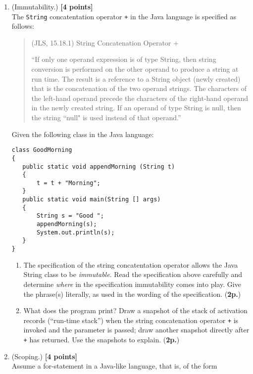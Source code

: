 \documentclass{article}
\begin{document}
\begin{enumerate}
\item (Immutability.) \hfill{\textbf{[4 points]}}
\\
The \texttt{String} concatentation operator \texttt{+} in the Java
language is specified as follows:


\begin{quote}
(JLS, 15.18.1) String Concatenation Operator +

``If only one operand expression is of type String, then string conversion is performed on the other operand to produce a string at run time. The result is a reference to a String object (newly created) that is the concatenation of the two operand strings. The characters of the left-hand operand precede the characters of the right-hand operand in the newly created string. If an operand of type String is null, then the string ``null" is used instead of that operand.''
\end{quote}

 Given the following class 
in the Java language: 
{\small 
\begin{verbatim}
class GoodMorning 
{
   public static void appendMorning (String t)
   {
       t = t + "Morning";
   }
   public static void main(String [] args)
   {
       String s = "Good ";
       appendMorning(s);
       System.out.println(s);
   }
}
\end{verbatim}
}
\begin{enumerate}
\item
The specification of the string concatentation operator allows 
the Java String class to be \textit{immutable}. Read the
specification above carefully and determine \textit{where} in the specification
immutability comes into play. Give the  phrase(s) literally, as used in 
the wording of the specification. (\textbf{2p.})
\item 
What does the program print? 
Draw a snapshot of the stack of activation records (``run-time stack'')
when the string concatenation operator \texttt{+} is invoked and the parameter is passed;
draw another snapshot directly after \texttt{+} has returned. 
Use the snapshots to explain. (\textbf{2p.})
\end{enumerate}


\item (Scoping.)
\hfill{\textbf{[4 points]}}
\\
Assume a for-statement in a Java-like language, that is, of the form
 

\end{enumerate}
\end{document}
